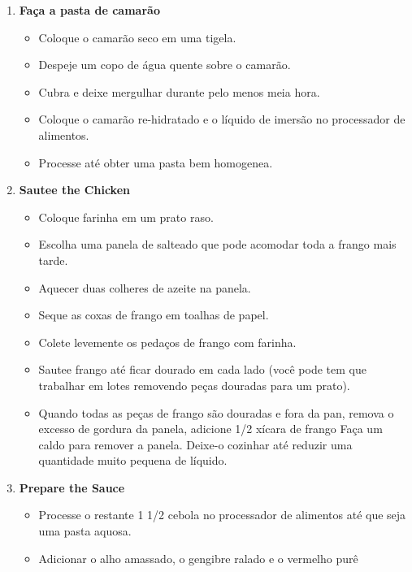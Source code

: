 \documentclass [11pt, letterpaper] {article}
\begin{document}
\begin {description}
\begin {enumerate}
\begin {itemize}
juntamente com 1/2 de uma cebola. Processe até
transforma-se numa pasta líquida. Adicione esta pasta \`as coxas de galinha salgadas.
\item Adicione o suco de um limão às coxas de galinha.
\item Certifique-se de que todas as peças estão revestidas e deixe no tempero, fora da geladeira, por uma hora.
\end {itemize}
\item {\bf Fa\c{c}a a pasta de camar\~ao}
\begin {itemize}
\item Coloque o camarão seco em uma tigela.
\item Despeje um copo de água quente sobre o camarão.
\item Cubra e deixe mergulhar durante pelo menos meia hora.
\item Coloque o camarão re-hidratado e o l\'iquido de imersão no processador de alimentos.
\item Processe até obter uma pasta bem homogenea.
\end {itemize}
\item {\bf Sautee the Chicken}
\begin {itemize}
\item Coloque farinha em um prato raso.
\item Escolha uma panela de salteado que pode acomodar toda a frango mais tarde.
\item Aquecer duas colheres de azeite na panela.
\item Seque as coxas de frango em toalhas de papel.
\item Colete levemente os pedaços de frango com farinha.
\item Sautee frango até ficar dourado em cada lado (você pode
tem que trabalhar em lotes removendo peças douradas para um prato).
\item Quando todas as peças de frango são douradas e fora da
pan, remova o excesso de gordura da panela, adicione 1/2 xícara de frango
Faça um caldo para remover a panela. Deixe-o cozinhar até reduzir
uma quantidade muito pequena de líquido.
\end {itemize}
\item {\bf Prepare the Sauce}
\begin {itemize}
\item Processe o restante 1 1/2 cebola no processador de alimentos
até que seja uma pasta aquosa.
\item Adicionar o alho amassado, o gengibre ralado e o vermelho purê

\end{itemize}
\end{enumerate}
\end{description}
\end{document}
